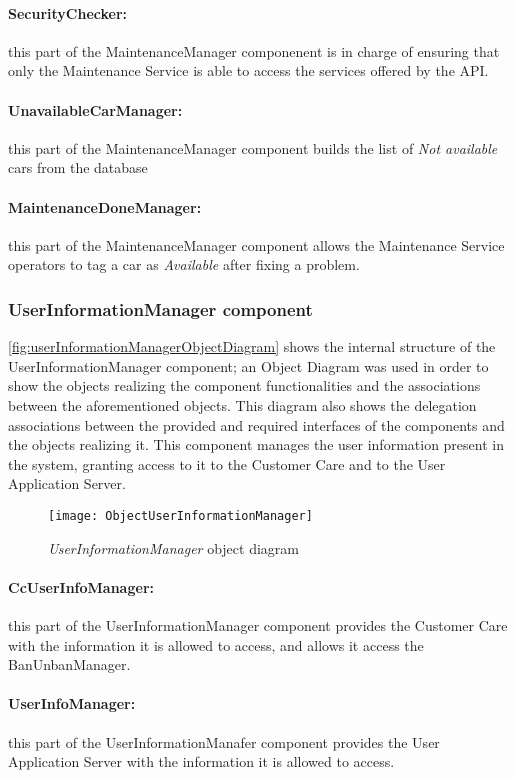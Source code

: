 \paragraph{SecurityChecker:} this part of the MaintenanceManager componenent is in charge of ensuring that only the Maintenance Service is able to access the services offered by the API.
\paragraph{UnavailableCarManager:} this part of the MaintenanceManager component builds the list of \emph{Not available} cars from the database
\paragraph{MaintenanceDoneManager:} this part of the MaintenanceManager component allows the Maintenance Service operators to tag a car as \emph{Available} after fixing a problem.

\subsubsection{UserInformationManager component}
\autoref{fig:userInformationManagerObjectDiagram} shows the internal structure of the UserInformationManager component; an Object Diagram was used in order to show the objects realizing the component functionalities and the associations between the aforementioned objects. This diagram also shows the delegation associations between the provided and required interfaces of the components and the objects realizing it.
This component manages the user information present in the system, granting access to it to the Customer Care and to the User Application Server.
\begin{figure}[h!]
	\centering
	\texttt{[image: ObjectUserInformationManager]}
	\caption{
		\label{fig:userInformationManagerObjectDiagram} 
		\emph{UserInformationManager} object diagram
	}
\end{figure}

\paragraph{CcUserInfoManager:} this part of the UserInformationManager component provides the Customer Care with the information it is allowed to access, and allows it access the BanUnbanManager.
\paragraph{UserInfoManager:} this part of the UserInformationManafer component provides the User Application Server with the information it is allowed to access.
